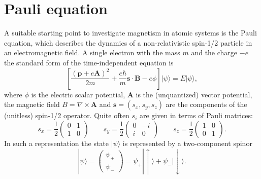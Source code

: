 
%
\section{Pauli equation}
A suitable starting point to investigate magnetism in atomic systems is the Pauli equation, which describes the dynamics of a non-relativistic spin-1/2 particle in an electromagnetic field. A single electron with the mass $m$ and the charge $-e$ the standard form of the time-independent equation is
\begin{equation}
\left[\frac{(\mathbf{p} + e \mathbf{A})^2}{2m} + \frac{e \hbar}{m} \mathbf{s} \cdot \mathbf{B} - e \phi \right] | \psi \rangle = E | \psi \rangle,
\end{equation}
where $\phi$ is the electric scalar potential, $\mathbf{A}$ is the (unquantized) vector potential, the magnetic field $B=\nabla \times \mathbf{A}$ and $\mathbf{s} = (s_x,s_y,s_z)$ are the components of the (unitless) spin-1/2 operator. Quite often $s_i$ are given in terms of Pauli matrices:
\begin{equation}
s_x = \frac{1}{2}\left( \begin{matrix}
0 & 1 \\
1 & 0 
\end{matrix} \right)
\qquad 
s_y = \frac{1}{2}\left( \begin{matrix}
0 & -i \\
i & 0 
\end{matrix} \right) 
\qquad
s_z = \frac{1}{2}\left( \begin{matrix}
1 & 0 \\
0 & 1 
\end{matrix} \right).
\end{equation}
In such a representation the state $| \psi \rangle$ is represented by a two-component spinor
\begin{equation}
| \psi \rangle = \left( \begin{matrix} \psi_+ \\ \psi_- \end{matrix} \right) =
\psi_+ |\uparrow \rangle + \psi_- | \downarrow \rangle.
\end{equation}

